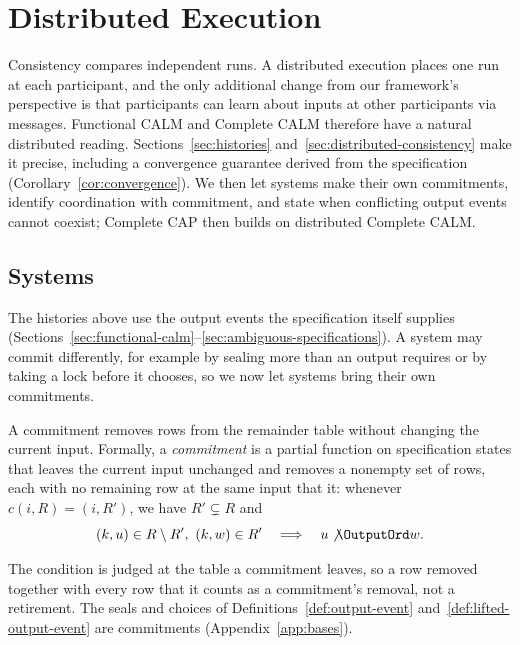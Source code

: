 \section{Distributed Execution}
\label{sec:distributed-execution}
\label{sec:complete-calm}

Consistency compares independent runs.  A distributed execution places one run
at each participant, and the only additional change from our framework's
perspective is that participants can learn about inputs at other participants
via messages.  Functional CALM and Complete CALM therefore have a natural
distributed reading.  Sections~\ref{sec:histories}
and~\ref{sec:distributed-consistency} make it precise, including a
convergence guarantee derived from the specification
(Corollary~\ref{cor:convergence}).  We then let systems make their own
commitments, identify coordination with commitment, and state when
conflicting output events cannot coexist; Complete CAP then builds on
distributed Complete CALM.



\subsection{Systems}
\label{sec:coordination}

The histories above use the output events the specification itself supplies
(Sections~\ref{sec:functional-calm}--\ref{sec:ambiguous-specifications}).  A
system may commit
differently, for example by sealing more than an output requires or by taking a
lock before it chooses, so we now let systems bring their own commitments.

\begin{definition}[Commitment]
\label{def:commitment}
A commitment removes rows from the remainder table without changing the
current input.  Formally, a \emph{commitment} is a partial function on
specification states that leaves the current input unchanged and removes a
nonempty set of rows, each with no remaining row at the same input that
\outrel it: whenever $c(i,R)=(i,R')$, we have $R'\subsetneq R$ and
\begin{equation}
  (k,u)\in R\setminus R',\ (k,w)\in R'
  \quad\Longrightarrow\quad
  u\not\OutputOrd w.
  \label{eq:commitment-excludes}
\end{equation}
\end{definition}

The condition is judged at the table a commitment leaves, so a row removed
together with every row that \outrel it counts as a commitment's removal, not a
retirement.  The seals and choices of Definitions~\ref{def:output-event}
and~\ref{def:lifted-output-event} are commitments
(Appendix~\ref{app:bases}).

